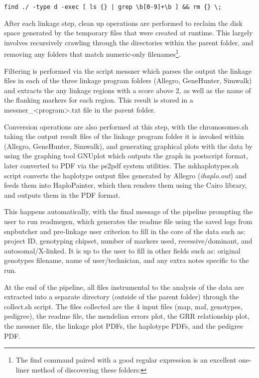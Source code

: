 \begin{lrbox}\scriptsize
    \verb!find ./ -type d -exec [ ls {} | grep \b[0-9]+\b ] && rm {} \;!
\end{lrbox}%

After each linkage step, clean up operations are performed to reclaim the disk space generated by the temporary files that were created at runtime. This largely involves recursively crawling through the directories within the parent folder, and removing any folders that match numeric-only filenames\footnote{The find command paired with a good regular expression is an excellent one-liner method of discovering these folders: \usebox{}}.

Filtering is performed via the script \gls{messner} which parses the output the linkage files in each of the three linkage program folders (Allegro, GeneHunter, Simwalk) and extracts the any linkage regions with a score above 2, as well as the name of the flanking markers for each region. This result is stored in a messner\_<program>.txt file in the parent folder.

Conversion operations are also performed at this step, with the \gls{chromosomes.sh} taking the output result files of the linkage program folder it is invoked within (Allegro, GeneHunter, Simwalk), and generating graphical plots with the data by using the graphing tool \gls{GNUplot} which outputs the graph in postscript format, later converted to \gls{PDF} via the \gls{ps2pdf} system utilities. The \gls{mkhaplotypes.sh} script converts the haplotype output files generated by Allegro (\textit{ihaplo.out}) and feeds them into \gls{HaploPainter}, which then renders them using the \gls{Cairo} library, and outputs them in the PDF format.

This happens automatically, with the final message of the pipeline prompting the user to run \gls{readmegen}, which generates the readme file using the saved logs from snpbutcher and pre-linkage user criterion to fill in the core of the data such as: project ID, genotyping chipset, number of markers used, recessive/dominant, and autosomal/X-linked. It is up to the user to fill in other fields such as: original genotypes filename, name of user/technician, and any extra notes specific to the run.

At the end of the pipeline, all files instrumental to the analysis of the data are extracted into a separate directory (outside of the parent folder) through the \gls{collect.sh} script. The files collected are the 4 input files (map, maf, genotypes, pedigree), the readme file, the mendelian errors plot, the GRR relationship plot, the messner file, the linkage plot PDFs, the haplotype PDFs, and the pedigree PDF.


